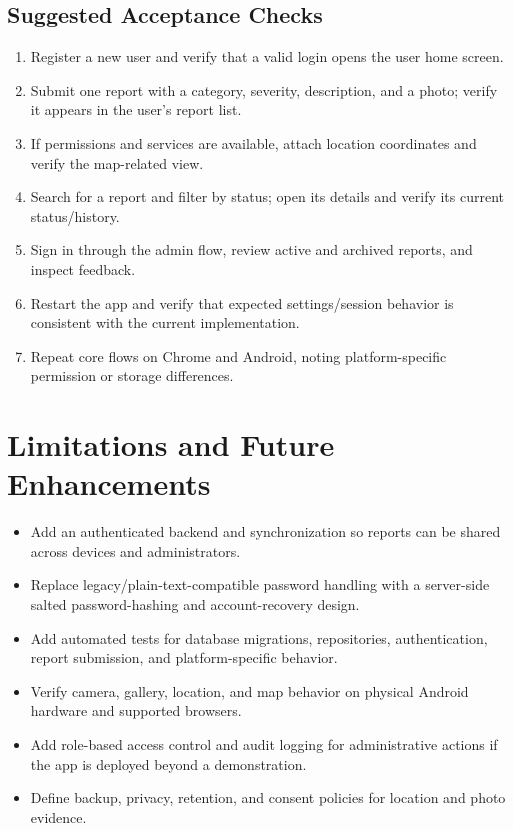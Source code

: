 \documentclass[12pt,a4paper]{report}
\begin{document}
\section{Suggested Acceptance Checks}
\begin{enumerate}
  \item Register a new user and verify that a valid login opens the user home screen.
  \item Submit one report with a category, severity, description, and a photo; verify it appears in the user's report list.
  \item If permissions and services are available, attach location coordinates and verify the map-related view.
  \item Search for a report and filter by status; open its details and verify its current status/history.
  \item Sign in through the admin flow, review active and archived reports, and inspect feedback.
  \item Restart the app and verify that expected settings/session behavior is consistent with the current implementation.
  \item Repeat core flows on Chrome and Android, noting platform-specific permission or storage differences.
\end{enumerate}

\chapter{Limitations and Future Enhancements}
\begin{itemize}
  \item Add an authenticated backend and synchronization so reports can be shared across devices and administrators.
  \item Replace legacy/plain-text-compatible password handling with a server-side salted password-hashing and account-recovery design.
  \item Add automated tests for database migrations, repositories, authentication, report submission, and platform-specific behavior.
  \item Verify camera, gallery, location, and map behavior on physical Android hardware and supported browsers.
  \item Add role-based access control and audit logging for administrative actions if the app is deployed beyond a demonstration.
  \item Define backup, privacy, retention, and consent policies for location and photo evidence.
\end{itemize}
\end{document}
